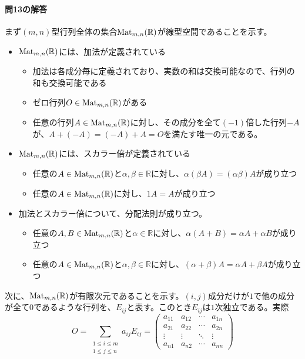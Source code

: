 \paragraph{問13の解答} まず$(m, n)$型行列全体の集合$\operatorname{Mat}_{m, n}(\mathbb{R})$が線型空間であることを示す。
\begin{itemize}
\item $\operatorname{Mat}_{m, n}(\mathbb{R})$には、加法が定義されている
\begin{itemize}
\item 加法は各成分毎に定義されており、実数の和は交換可能なので、行列の和も交換可能である
\item ゼロ行列$O \in \operatorname{Mat}_{m, n}(\mathbb{R})$がある
\item 任意の行列$A \in \operatorname{Mat}_{m, n}(\mathbb{R})$に対し、その成分を全て$(-1)$倍した行列$-A$が、$A + (-A) = (-A) + A = O$を満たす唯一の元である。
\end{itemize}
\item $\operatorname{Mat}_{m, n}(\mathbb{R})$には、スカラー倍が定義されている
\begin{itemize}
\item 任意の$A \in \operatorname{Mat}_{m, n}(\mathbb{R})$と$\alpha, \beta\in \mathbb{R}$に対し、$\alpha (\beta A) = (\alpha \beta)A$が成り立つ
\item 任意の$A \in \operatorname{Mat}_{m, n}(\mathbb{R})$に対し、$1A = A$が成り立つ
\end{itemize}
\item 加法とスカラー倍について、分配法則が成り立つ。
\begin{itemize}
\item 任意の$A, B\in \operatorname{Mat}_{m, n}(\mathbb{R})$と$\alpha \in \mathbb{R}$に対し、$\alpha(A + B) = \alpha A + \alpha B$が成り立つ
\item 任意の$A \in \operatorname{Mat}_{m, n}(\mathbb{R})$と$\alpha, \beta \in \mathbb{R}$に対し、$(\alpha + \beta)A = \alpha A + \beta A$が成り立つ
\end{itemize}
\end{itemize}
次に、$\operatorname{Mat}_{m, n}(\mathbb{R})$が有限次元であることを示す。$(i, j)$成分だけが$1$で他の成分が全て$0$であるような行列を、$E_{ij}$と表す。このとき$E_{ij}$は$1$次独立である。実際
\[
O = \sum_{\substack{1 \leq i \leq m \\ 1 \leq j \leq n}} a_{ij} E_{ij} =
\begin{pmatrix}
a_{11} & a_{12} & \cdots & a_{1n} \\
a_{21} & a_{22} & \cdots & a_{2n} \\
\vdots & \vdots & \ddots & \vdots \\
a_{n1} & a_{n2} & \cdots & a_{nn}
\end{pmatrix}
\]
